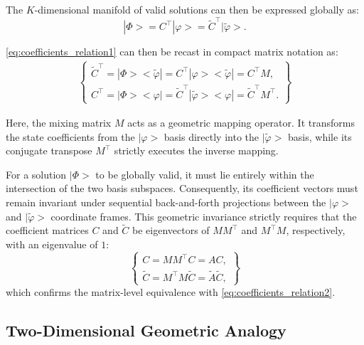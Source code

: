 The \(K\)-dimensional manifold of valid solutions can then be expressed globally as:
\begin{equation}
    |\Phi\big> = C^\top |\varphi\big> = \tilde{C}^\top |\tilde{\varphi}\big>.
\end{equation}

\cref{eq:coefficients_relation1} can then be recast in compact matrix notation as:
\begin{equation}
\begin{aligned}
    \begin{Bmatrix} 
        \tilde{C}^\top = |\Phi\big> \big< \tilde{\varphi}| = C^\top |\varphi\big> \big< \tilde{\varphi}| = C^\top M, \\
        C^\top = |\Phi\big> \big< \varphi| = \tilde{C}^\top |\tilde{\varphi}\big> \big< \varphi| = \tilde{C}^\top M^\top.
    \end{Bmatrix}
\end{aligned}
\end{equation}

Here, the mixing matrix \(M\) acts as a geometric mapping operator. It transforms the state coefficients from the \( |\varphi\big> \) basis directly into the \( |\tilde{\varphi}\big> \) basis, while its conjugate transpose \( M^\top \) strictly executes the inverse mapping.

For a solution \( |\Phi\big> \) to be globally valid, it must lie entirely within the intersection of the two basis subspaces. Consequently, its coefficient vectors must remain invariant under sequential back-and-forth projections between the \( |\varphi\big> \) and \( |\tilde{\varphi}\big> \) coordinate frames. This geometric invariance strictly requires that the coefficient matrices \(C\) and \(\tilde{C}\) be eigenvectors of \( MM^\top \) and \( M^\top M \), respectively, with an eigenvalue of $1$:
\begin{equation}
    \begin{Bmatrix}
    C = MM^\top C = AC, \\
    \tilde{C} = M^\top M \tilde{C} = \tilde{A} \tilde{C},
    \end{Bmatrix}
\end{equation}
which confirms the matrix-level equivalence with \cref{eq:coefficients_relation2}.

\subsection{Two-Dimensional Geometric Analogy}\label{subsec:geometric_view}

